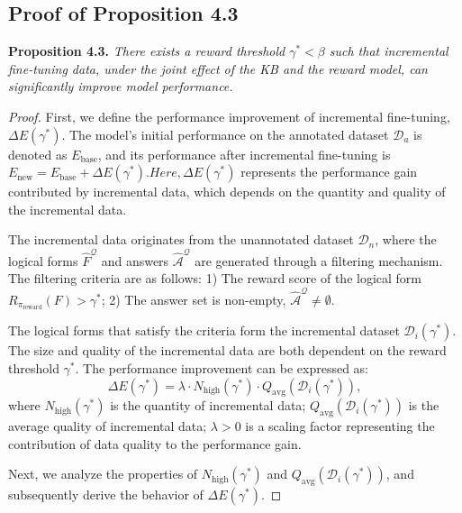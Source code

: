 \documentclass{article}
\theoremstyle{plain}
\theoremstyle{definition}
\theoremstyle{remark}
\begin{document}
\subsection{Proof of Proposition 4.3}
\label{proof3}
\textbf{Proposition 4.3.}
\textit{There exists a reward threshold $\gamma^*<\beta$ such that incremental fine-tuning data, under the joint effect of the KB and the reward model, can significantly improve model performance.}
\begin{proof} 
First, we define the performance improvement of incremental fine-tuning, $\Delta E(\gamma^*)$. The model’s initial performance on the annotated dataset $\mathcal{D}_a$ is denoted as $E_{\text{base}}$, and its performance after incremental fine-tuning is $E_{\text{new}} = E_{\text{base}} + \Delta E(\gamma^*). Here, \Delta E(\gamma^*)$ represents the performance gain contributed by incremental data, which depends on the quantity and quality of the incremental data.

The incremental data originates from the unannotated dataset $\mathcal{D}_n$, where the logical forms $\hat{F}^{\mathcal{Q}}$ and answers $\hat{\mathcal{A}}^{\mathcal{Q}}$ are generated through a filtering mechanism. The filtering criteria are as follows: 1)	The reward score of the logical form $R_{\pi_{\text{reward}}}(F) > \gamma^*$; 2) The answer set is non-empty, $\hat{\mathcal{A}}^{\mathcal{Q}} \neq \emptyset$.

The logical forms that satisfy the criteria form the incremental dataset $\mathcal{D}_i(\gamma^*)$. The size and quality of the incremental data are both dependent on the reward threshold $\gamma^*$.
The performance improvement can be expressed as:
\begin{equation}
\Delta E(\gamma^*) = \lambda \cdot N_{\text{high}}(\gamma^*) \cdot Q_{\text{avg}}(\mathcal{D}_i(\gamma^*)),
\end{equation}
where $N_{\text{high}}(\gamma^*)$ is the quantity of incremental data; $Q_{\text{avg}}(\mathcal{D}_i(\gamma^*))$ is the average quality of incremental data; $\lambda > 0$ is a scaling factor representing the contribution of data quality to the performance gain.

Next, we analyze the properties of $N_{\text{high}}(\gamma^*)$ and $Q_{\text{avg}}(\mathcal{D}_i(\gamma^*))$, and subsequently derive the behavior of $\Delta E(\gamma^*)$.


\end{proof}
\end{document}
